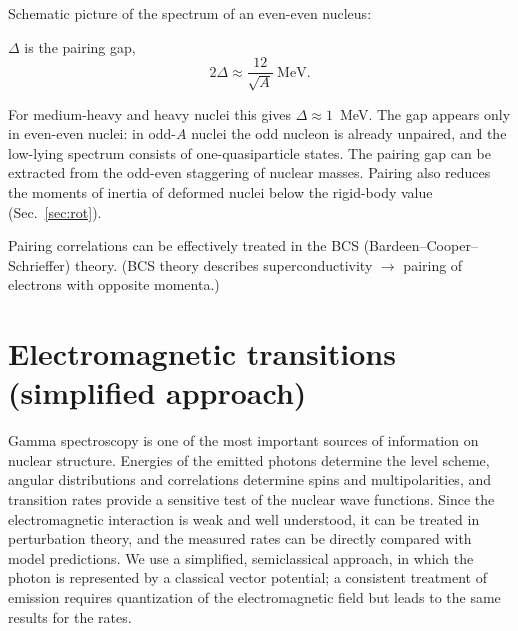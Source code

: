 \documentclass[11pt,a4paper]{article}
\begin{document}
Schematic picture of the spectrum of an even-even nucleus:
\begin{center}
\end{center}
$\Delta$ is the pairing gap,
\[
2\Delta\approx\frac{12}{\sqrt A}\ \text{MeV}.
\]

For medium-heavy and heavy nuclei this gives $\Delta\approx1$~MeV. The gap appears only in even-even nuclei: in odd-$A$ nuclei the odd nucleon is already unpaired, and the low-lying spectrum consists of one-quasiparticle states. The pairing gap can be extracted from the odd-even staggering of nuclear masses. Pairing also reduces the moments of inertia of deformed nuclei below the rigid-body value (Sec.~\ref{sec:rot}).

Pairing correlations can be effectively treated in the BCS (Bardeen--Cooper--Schrieffer) theory. (BCS theory describes superconductivity $\to$ pairing of electrons with opposite momenta.)

\section{Electromagnetic transitions (simplified approach)}

Gamma spectroscopy is one of the most important sources of information on nuclear structure. Energies of the emitted photons determine the level scheme, angular distributions and correlations determine spins and multipolarities, and transition rates provide a sensitive test of the nuclear wave functions. Since the electromagnetic interaction is weak and well understood, it can be treated in perturbation theory, and the measured rates can be directly compared with model predictions. We use a simplified, semiclassical approach, in which the photon is represented by a classical vector potential; a consistent treatment of emission requires quantization of the electromagnetic field but leads to the same results for the rates.
\end{document}
